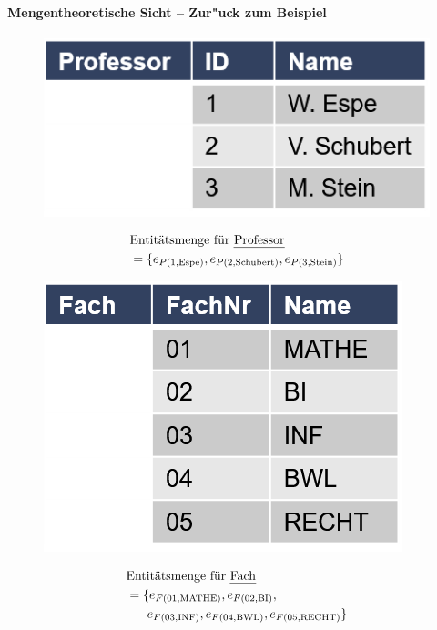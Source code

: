 \begin{frame}{\insertsection}
\framesubtitle{Mengentheoretische Sicht -- Zur"uck zum Beispiel}
\centering 
\begin{minipage}[c]{0.3\linewidth}
	\begin{figure} 
		\includegraphics[scale=0.45]{img/ERM-BeispielEntitaetsmengeProfessor.png}
	\end{figure}
\end{minipage}
\begin{minipage}[c]{0.5\linewidth}
	\begin{equation*}
	\begin{split} 
	&\text{Entit\"atsmenge f\"ur \emph{Professor}}\\
	&=\{e_{P(1, \text{Espe})},e_{P(2,\text{Schubert})},e_{P(3, \text{Stein})}\}
	\end{split}
	\end{equation*}
\end{minipage}
\abs\abs\abs 
\begin{minipage}[c]{0.3\linewidth}
	\begin{figure} 
		\includegraphics[scale=0.45]{img/ERM-BeispielEntitaetsmengeFach.png}
	\end{figure}
\end{minipage}
\begin{minipage}[c]{0.5\linewidth}
	\begin{equation*}
	\begin{split} 
	&\text{Entit\"atsmenge f\"ur \emph{Fach}}\\
	&=\{e_{F(01,\text{MATHE})},e_{F(02,\text{BI})},\\
	&\quad\,\,\,\, e_{F(03,\text{INF})},e_{F(04,\text{BWL})},e_{F(05,\text{RECHT})}\}
	\end{split}
	\end{equation*}
\end{minipage}
\end{frame} 

